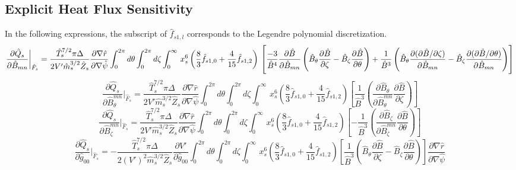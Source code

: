 \documentclass[11pt]{amsart}
\newcommand{\partder}[2]{\dfrac{\partial #1}{\partial #2}} %
\begin{document}
\subsection{Explicit Heat Flux Sensitivity}
In the following expressions, the subscript of $\hat{f}_{s1,l}$ corresponds to the Legendre polynomial discretization.
\begin{dmath}
\partder{\hat{Q}_s}{\hat{B}_{mn}}  \bigg \rvert_{\hat{F}_s} = \frac{\hat{T}_s^{7/2} \pi \Delta}{2 V' \hat{m}_s^{3/2} \hat{Z}_s} \partder{ \nabla \hat{r}}{\nabla \hat{\psi}} \int_0^{2\pi} d \theta \int_0^{2\pi} d \zeta \int_0^{\infty} \, x_s^6 \left( \frac{8}{3} \hat{f}_{s1,0}  + \frac{4}{15} \hat{f}_{s1,2}  \right) \\\left[ \frac{-3}{\hat{B}^4} \partder{\hat{B}}{\hat{B}_{mn}} \left( \hat{B}_{\theta} \partder{\hat{B}}{\zeta} - \hat{B}_{\zeta} \partder{\hat{B}}{\theta} \right) + \frac{1}{\hat{B}^3}\left( \hat{B}_{\theta} \partder{(\partial \hat{B}/\partial \zeta)}{\hat{B}_{mn}} - \hat{B}_{\zeta} \partder{(\partial \hat{B}/\partial \theta)}{\hat{B}_{mn}} \right) \right]
\end{dmath}
\begin{dmath}
\partder{\hat{Q}_s}{\hat{B}_{\theta}^{mn}} \bigg \rvert_{\hat{F}_s} = \frac{\hat{T}_s^{7/2} \pi \Delta}{2 V' \hat{m}_s^{3/2} \hat{Z}_s} \partder{ \nabla \hat{r}}{\nabla \hat{\psi}} \int_0^{2\pi} d \theta \int_0^{2\pi} d \zeta \int_0^{\infty} \, x_s^6 \left( \frac{8}{3} \hat{f}_{s1,0}  + \frac{4}{15} \hat{f}_{s1,2}  \right) \left[ \frac{1}{\hat{B}^3} \left( \partder{\hat{B}_{\theta}}{\hat{B}_{\theta}^{mn}} \partder{\hat{B}}{\zeta}\right) \right] 
\end{dmath}
\begin{dmath}
\partder{\hat{Q}_s}{\hat{B}_{\zeta}^{mn}}  \bigg \rvert_{\hat{F}_s} = \frac{\hat{T}_s^{7/2} \pi \Delta}{2 V' \hat{m}_s^{3/2} \hat{Z}_s} \partder{ \nabla \hat{r}}{\nabla \hat{\psi}} \int_0^{2\pi} d \theta \int_0^{2\pi} d \zeta \int_0^{\infty} \, x_s^6 \left(\frac{8}{3} \hat{f}_{s1,0}  + \frac{4}{15} \hat{f}_{s1,2}  \right) \left[ - \frac{1}{\hat{B}^3} \left( \partder{\hat{B}_{\zeta}}{\hat{B}_{\zeta}^{mn}} \partder{\hat{B}}{\theta} \right) \right] 
\end{dmath}
\begin{dmath}
\partder{\hat{Q}_s}{\hat{g}_{00}}  \bigg \rvert_{\hat{F}_s} = -\frac{\hat{T}_s^{7/2} \pi \Delta}{2 (V')^2 \hat{m}_s^{3/2} \hat{Z}_s} \partder{V'}{\hat{g}_{00}} \int_0^{2\pi} d \theta \int_0^{2\pi} d \zeta \int_0^{\infty} \, x_s^6 \left(\frac{8}{3} \hat{f}_{s1,0}  + \frac{4}{15} \hat{f}_{s1,2}  \right)  \left[ \frac{1}{ \hat{B}^3 } \left( \hat{B}_{\theta} \partder{\hat{B}}{\zeta} - \hat{B}_{\zeta} \partder{\hat{B}}{\theta} \right) \right] \partder{ \nabla \hat{r}}{\nabla \hat{\psi}}
\end{dmath}
\end{document}
